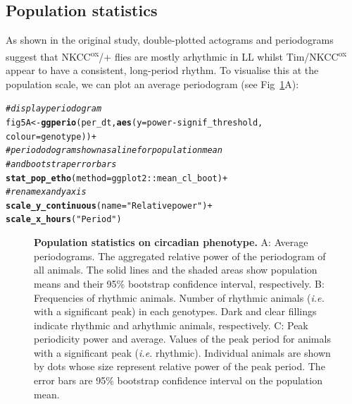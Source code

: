 \documentclass[10pt,letterpaper]{article}\usepackage[]{graphicx}\usepackage[]{color}
\makeatletter
\newcommand{\hlstr}[1]{\textcolor[rgb]{0.192,0.494,0.8}{#1}}%
\newcommand{\hlcom}[1]{\textcolor[rgb]{0.678,0.584,0.686}{\textit{#1}}}%
\newcommand{\hlopt}[1]{\textcolor[rgb]{0,0,0}{#1}}%
\newcommand{\hlstd}[1]{\textcolor[rgb]{0.345,0.345,0.345}{#1}}%
\newcommand{\hlkwb}[1]{\textcolor[rgb]{0.69,0.353,0.396}{#1}}%
\newcommand{\hlkwc}[1]{\textcolor[rgb]{0.333,0.667,0.333}{#1}}%
\newcommand{\hlkwd}[1]{\textcolor[rgb]{0.737,0.353,0.396}{\textbf{#1}}}%
\newenvironment{kframe}{%
 \def\at@end@of@kframe{}%
 \ifinner\ifhmode%
  \def\at@end@of@kframe{\end{minipage}}%
  \begin{minipage}{\columnwidth}%
 \fi\fi%
 \def\FrameCommand##1{\hskip\@totalleftmargin \hskip-\fboxsep
 \colorbox{shadecolor}{##1}\hskip-\fboxsep
     \hskip-\linewidth \hskip-\@totalleftmargin \hskip\columnwidth}%
 \MakeFramed {\advance\hsize-\width
   \@totalleftmargin\z@ \linewidth\hsize
   \@setminipage}}%
 {\par\unskip\endMakeFramed%
 \at@end@of@kframe}
\newenvironment{knitrout}{}{} %
\makeatother
\begin{document}
\subsection*{Population statistics}

As shown in the original study, double-plotted actograms and periodograms suggest that NKCC\textsuperscript{ox}/+ flies are mostly 
arhythmic in LL whilst Tim/NKCC\textsuperscript{ox} appear to have a consistent, long-period rhythm.
To visualise this at the population scale, we can plot an average periodogram (see Fig~\ref{fig:fig-5}A):

\begin{knitrout}
\color{fgcolor}\begin{kframe}
\begin{alltt}
\hlcom{# display periodogram }
\hlstd{fig5A} \hlkwb{<-} \hlkwd{ggperio}\hlstd{(per_dt,} \hlkwd{aes}\hlstd{(}\hlkwc{y} \hlstd{= power} \hlopt{-} \hlstd{signif_threshold,}
                             \hlkwc{colour} \hlstd{= genotype))} \hlopt{+}
          \hlcom{# periododogram shown as a line for population mean}
          \hlcom{# and bootstrap error bars}
          \hlkwd{stat_pop_etho}\hlstd{(}\hlkwc{method} \hlstd{= ggplot2}\hlopt{::}\hlstd{mean_cl_boot)} \hlopt{+}
          \hlcom{# rename x and y axis }
          \hlkwd{scale_y_continuous}\hlstd{(}\hlkwc{name} \hlstd{=} \hlstr{"Relative power"}\hlstd{)} \hlopt{+}
          \hlkwd{scale_x_hours}\hlstd{(}\hlstr{"Period"}\hlstd{)}
\end{alltt}
\end{kframe}
\end{knitrout}



\begin{figure}[!h]
	\caption{{\bf Population statistics on circadian phenotype.}
			A: Average periodograms. 
			      The aggregated relative power of the periodogram of all animals.
			      The solid lines and the shaded areas show population means and their 95\% bootstrap confidence interval, respectively.
			B: Frequencies of rhythmic animals.
			      Number of rhythmic animals (\emph{i.e.} with a significant peak) in each genotypes.
			      Dark and clear fillings indicate rhythmic and arhythmic animals, respectively.
      C: Peak periodicity power and average.
			      Values of the peak period for animals with a significant peak (\emph{i.e.} rhythmic).
			      Individual animals are shown by dots whose size represent relative power of the peak period.
			      The error bars are 95\% bootstrap confidence interval on the population mean.
			      }
	\label{fig:fig-5}
\end{figure}
\end{document}
